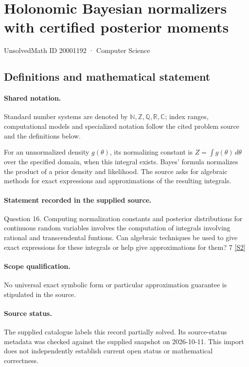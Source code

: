 \documentclass[11pt]{article}
\newcommand{\sref}[2]{\hyperlink{source:#1:#2}{[S#2]}}
\begin{document}
\setcounter{section}{20001191}
\section{Holonomic Bayesian normalizers with certified posterior moments}\label{20001192}
{\small\sffamily UnsolvedMath ID 20001192 · Computer Science}
\subsection{Definitions and mathematical statement}

\paragraph{Shared notation.}Standard number systems are denoted by $\mathbb N,\mathbb Z,\mathbb Q,\mathbb R,\mathbb C$; index ranges, computational models and specialized notation follow the cited problem source and the definitions below.


For an unnormalized density $g(\theta)$, its normalizing constant is $Z=\int g(\theta)\,d\theta$ over the specified domain, when this integral exists. Bayes' formula normalizes the product of a prior density and likelihood. The source asks for algebraic methods for exact expressions and approximations of the resulting integrals.
\paragraph{Statement recorded in the supplied source.}
Question 16. Computing normalization constants and posterior distributions for continuous random variables involves the computation of integrals involving rational and transcendental funtions. Can algebraic techniques be used to give exact expressions for these integrals or help give approximations for them? 7 \sref{20001192}{2}
\paragraph{Scope qualification.}
No universal exact symbolic form or particular approximation guarantee is stipulated in the source.
\paragraph{Source status.}
The supplied catalogue labels this record partially solved. Its source-status metadata was checked against the supplied snapshot on 2026-10-11. This import does not independently establish current open status or mathematical correctness.
\end{document}
